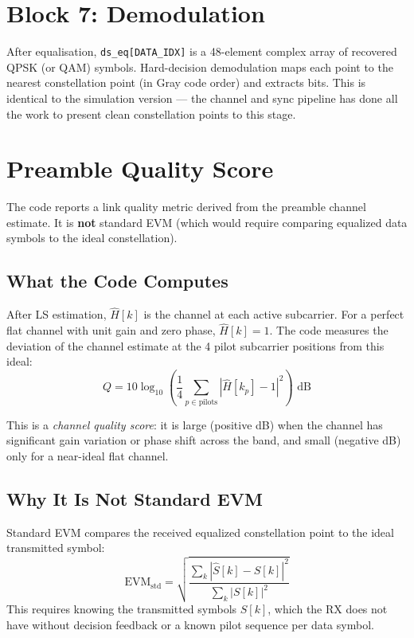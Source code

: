\documentclass[11pt,a4paper]{article}
\begin{document}
\section{Block 7: Demodulation}

After equalisation, \texttt{ds\_eq[DATA\_IDX]} is a 48-element complex array of
recovered QPSK (or QAM) symbols.  Hard-decision demodulation maps each point
to the nearest constellation point (in Gray code order) and extracts bits.
This is identical to the simulation version --- the channel and sync pipeline
has done all the work to present clean constellation points to this stage.

\section{Preamble Quality Score}

The code reports a link quality metric derived from the preamble channel
estimate.  It is \textbf{not} standard EVM (which would require comparing
equalized data symbols to the ideal constellation).

\subsection{What the Code Computes}

After LS estimation, $\hat{H}[k]$ is the channel at each active subcarrier.
For a perfect flat channel with unit gain and zero phase, $\hat{H}[k] = 1$.
The code measures the deviation of the channel estimate at the 4 pilot
subcarrier positions from this ideal:
\begin{equation}
  Q = 10\log_{10}\!\left(\frac{1}{4}\sum_{p \in \text{pilots}}
    \left|\hat{H}[k_p] - 1\right|^2\right) \text{ dB}
\end{equation}

This is a \emph{channel quality score}: it is large (positive dB) when the
channel has significant gain variation or phase shift across the band, and
small (negative dB) only for a near-ideal flat channel.

\subsection{Why It Is Not Standard EVM}

Standard EVM compares the received equalized constellation point to the ideal
transmitted symbol:
\begin{equation}
  \text{EVM}_{\text{std}} = \sqrt{\frac{\sum_k |\hat{S}[k] - S[k]|^2}
    {\sum_k |S[k]|^2}}
\end{equation}
This requires knowing the transmitted symbols $S[k]$, which the RX does not
have without decision feedback or a known pilot sequence per data symbol.
\end{document}
